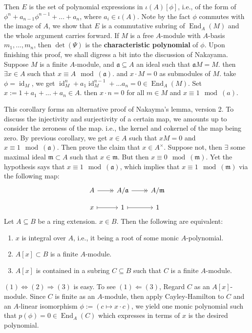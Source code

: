 \documentclass[12pt]{article}
\theoremstyle{definition}
\theoremstyle{plain}
\DeclareMathOperator{\id}{id}
\DeclareMathOperator{\End}{End}
\begin{document}
Then $E$ is the set of polynomial expressions in $\iota(A)[\phi]$, i.e., of the form of $\phi^n+a_{n-1}\phi^{n-1}+...+a_n$, where $a_i\in \iota(A)$. Note by the fact $\phi$ commutes with the image of $A$, we show that $E$ is a commutative subring of $\End_A(M)$ and the whole argument carries forward.
\Rmk If $M$ is a free $A$-module with $A$-basis $m_1, ..., m_n$, then $\det(\Psi)$ is the \textbf{characteristic polynomial} of $\phi$.
Upon finishing this proof, we shall digress a bit into the discussion of Nakayama.
\Cor Suppose $M$ is a finite $A$-module, and $\mathfrak{a}\subseteq A$ an ideal such that $\mathfrak{a}M=M$. then $\exists x\in A$ such that $x\equiv A\mod(\mathfrak{a})$. and $x\cdot M=0$ as submodules of $M$.
\proof take $\phi=\id_M$, we get $\id_M^n+a_1\id_M^{n-1}+...a_n=0\in \End_A(M)$. Set $x:=1+a_1+...+a_n\in A$. then $x\cdot n=0$ for all $m\in M$ and $x\equiv 1\mod(a)$.

\medskip
This corollary forms an alternative proof of Nakayma's lemma, version 2.
\Rmk To discuss the injectivity and surjectivity of a certain map, we amounts up to consider the zeroness of the map. i.e., the kernel and cokernel of the map being zero.
\proof By previous corollary, we get $x\in A$ such that $xM=0$ and $x\equiv 1\mod(\mathfrak{a})$. Then prove the claim that $x\in A^\times$. Suppose not, then $\exists $ some maximal ideal $\mathfrak{m}\subset A$ such that $x\in \mathfrak{m}$. But then $x\equiv 0\mod(\mathfrak{m})$. Yet the hypothesis says that $x\equiv 1 \mod (\mathfrak{a})$, which implies that $x\equiv 1\mod(\mathfrak{m})$ via the following map:
\begin{equation*}
  \begin{tikzcd}[column sep=normal, row sep=small]
    A\ar[->>]{r}&A/\mathfrak{a}\ar[->>]{r}&A/\mathfrak{m}\\
    x\ar[|->]{r}&1\ar[|->]{r}&1
  \end{tikzcd}
\end{equation*}
\Prop Let $A\subseteq B$ be a ring extension. $x\in B$. Then the following are equivalent:
\begin{enumerate}
  \item $x$ is integral over $A$, i.e., it being a root of some monic $A$-polynomial.
  \item $A[x]\subset B$ is a finite $A$-module.
  \item $A[x]$ is contained in a subring $C\subseteq B$ such that $C$ is a finite $A$-module.
\end{enumerate}
\proof $(1)\iff(2)\Rightarrow (3)$ is easy. To see $(1)\Leftarrow (3)$, Regard $C$ as an $A[x]$-module. Since $C$ is finite as an $A$-module, then apply Cayley-Hamilton to $C$ and an $A$-linear isomorphism $\phi:=(c\mapsto x\cdot c)$, we yield one monic polynomial such that $p(\phi)=0\in \End_A(C)$ which expresses in terms of $x$ is the desired polynomial.\qedhere
\end{document}
